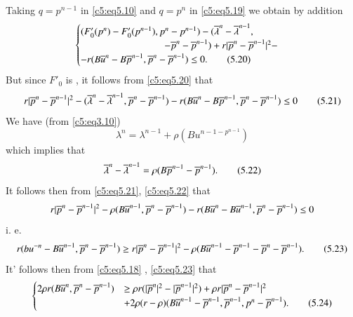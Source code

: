  Taking $q = p^{n-1}$ in \eqref{c5:eq5.10} and $q = p^n$ in
 \eqref{c5:eq5.19}  we obtain by addition 
 \begin{equation}
\begin{cases}
(F'_0 (p^n) - F'_0 (p^{n - 1}),  p^n - p^{n-1}) - (\ob{\lambda}^{n} -
  \ob{\lambda}^{n - 1},\\   
 \hspace{3cm} -\ob{p}^{n} - \ob{p}^{n -1}) + r | \ob{p}^{n}- \ob{p}^{n
   -1}|^2 - \\ 
  -r(B \ob{u}^{n} - B \ob{p}^{n -1},  \ob{p}^{n} - \ob{p}^{n-1}) \leq
  0. \tag{5.20}\label{c5:eq5.20} 
\end{cases}
 \end{equation} 
 But since $F'_0$ is , it follows from \eqref{c5:eq5.20} that 
 \begin{equation}
   r | \overline{p}^{n} - \overline{p}^{n-1}|^2 - (\overline{\lambda}^{n} -
   \overline{\lambda}^{n-1},  \overline{p}^{n}- \overline{p}^{n-1}) 
   -r (B\overline{u}^{n}-B\overline{p}^{n-1}, \overline{p}^{n}- \overline{p}^{n-1}) \leq
   0\tag{5.21}\label{c5:eq5.21} 
 \end{equation} 
 We have (from \eqref{c5:eq3.10}) 
 $$
 \lambda^n = \lambda^{n - 1} + \rho (Bu ^{n - 1 - p^{n-1}})
 $$
 which implies that 
 \begin{equation}
\overline{\lambda}^{n} - \overline{\lambda}^{n - 1}= \rho (B\overline{p}^{n-1} -
\overline{p}^{n - 1}). \tag{5.22}\label{c5:eq5.22} 
 \end{equation} 
 It follows then from \eqref{c5:eq5.21}, \eqref{c5:eq5.22} that 
 $$
 r | \overline{p}^{n} - \overline{p}^{n-1}|^2 - \rho (B\overline{u}^{n-1},  \overline{p}^{n} -
 \overline{p}^{n - 1}) - r 
 (B\overline{u}^{n} - B\overline{u}^{n -1}, \overline{p}^{n} - \overline{p}^{n - 1}) \leq 0
 $$
 i. e. 
 \begin{equation}
r (b u^{-n} - B \overline{u}^{n - 1}, \overline{p}^{n} - \overline{p}^{n - 1}) \geq r | \overline{p}^{n} -
 \overline{p}^{n - 1}|^2 -  
\rho(B\overline{u}^{n - 1} -\overline{p}^{n -1} - \overline{p}^{n}
-\overline{p}^{n-1}). \tag{5.23}\label{c5:eq5.23} 
 \end{equation} 
It' follows then from \eqref{c5:eq5.18} , \eqref{c5:eq5.23} that
\begin{equation}
\begin{cases}
2 \rho r (B\overline{u}^{n}, \overline{p}^{n} -\overline{p}^{n-1}) &\geq  \rho r (|
\overline{p}^{n} |^2 - |\overline{p}^{n-1}|^2 ) +  \rho r | \overline{p}^{n} - \overline{p}^{n-1}|^2 \\  
 & + 2 \rho (r - \rho) (B\overline{u}^{n-1} -\overline{p}^{n-1}, \overline{p}^{n-1},  p^n
  - \overline{p}^{n - 1}). \tag{5.24}\label{c5:eq5.24}
\end{cases}
\end{equation}

